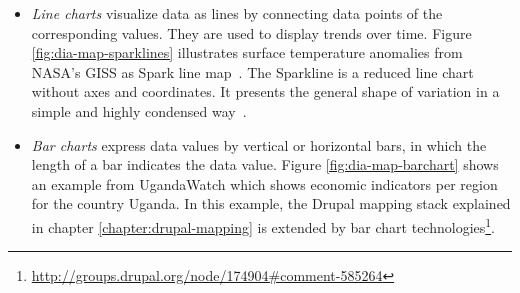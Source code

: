 \begin{itemize}
\begin{itemize}
\item \textit{Line charts} visualize data as lines by connecting data points of the corresponding values. They are used to display trends over time. Figure \ref{fig:dia-map-sparklines} illustrates surface temperature anomalies from NASA's GISS as Spark line map~\cite{web:sparkmaps}. The Sparkline is a reduced line chart without axes and coordinates. It presents the general shape of variation in a simple and highly condensed way~\cite{wiki:sparkline}.

\item \textit{Bar charts} express data values by vertical or horizontal bars, in which the length of a bar indicates the data value. Figure \ref{fig:dia-map-barchart} shows an example from UgandaWatch which shows economic indicators per region for the country Uganda. In this example, the Drupal mapping stack explained in chapter \ref{chapter:drupal-mapping} is extended by bar chart technologies\footnote{\url{http://groups.drupal.org/node/174904\#comment-585264}}.


\end{itemize}
\end{itemize}
